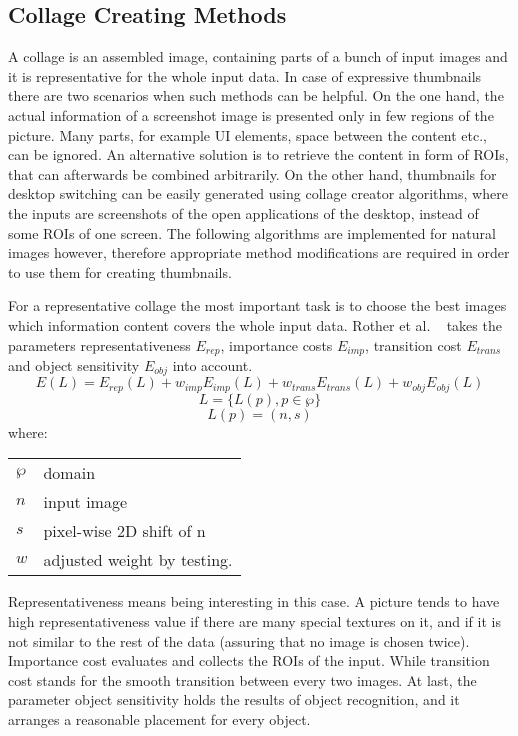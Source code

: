 \documentclass[draft,final]{vutinfth} %
\makeatletter
\newenvironment{conditions}
{\par\vspace{\abovedisplayskip}\noindent\begin{tabular}{>{$}l<{$} @{${}:{}$} l}}
	{\end{tabular}\par\vspace{\belowdisplayskip}}
\makeatother
\begin{document}
	\subsection{Collage Creating Methods} 
	A collage is an assembled image, containing parts of a bunch of input images and it is representative for the whole input data.
	In case of expressive thumbnails there are two scenarios when such methods can be helpful.
	On the one hand, the actual information of a screenshot image is presented only in few regions of the picture.
	Many parts, for example UI elements, space between the content etc., can be ignored. 
	An alternative solution is to retrieve the content in form of ROIs, that can afterwards be combined arbitrarily.
	On the other hand, thumbnails for desktop switching can be easily generated using collage creator algorithms, where the inputs are screenshots of the open applications of the desktop, instead of some ROIs of one screen.
	The following algorithms are implemented for natural images however, therefore appropriate method modifications are required in order to use them for creating thumbnails.\par
	For a representative collage the most important task is to choose the best images which information content covers the whole input data.
	Rother et al. ~\cite{rother2006autocollage} takes the parameters representativeness $E_{rep}$, importance costs  $E_{imp}$, transition cost  $E_{trans}$ and object sensitivity  $E_{obj}$ into account.
	\[ E(L)=E_{rep}(L)+w_{imp}E_{imp}(L)+w_{trans}E_{trans}(L)+w_{obj}E_{obj}(L) \]
	\[L = \{L(p), p \in \wp\}\]
	\[L(p) = (n, s)\]
	where:
	\begin{center}
		\begin{conditions}
			\wp & domain \\
			n & input image \\
			s & pixel-wise 2D shift of n \\
			w & adjusted weight by testing. 
		\end{conditions}
	\end{center}
	Representativeness means being interesting in this case.
	A picture tends to have high representativeness value if there are many special textures on it, and if it is not similar to the rest of the data (assuring that no image is chosen twice).
	Importance cost evaluates and collects the ROIs of the input.
	While transition cost stands for the smooth transition between every two images.
	At last, the parameter object sensitivity holds the results of object recognition, and it arranges a reasonable placement for every object.\par
\end{document}
